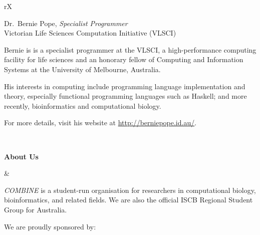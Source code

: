\documentclass[10pt]{article}
\begin{document}
\begin{minipage}[t]{\linewidth}
\begin{tabu}{rX}
\begin{varwidth}[t]{\linewidth}
                               Dr.~Bernie Pope, \emph{Specialist Programmer}\\
                        Victorian Life Sciences Computation Initiative (VLSCI) \par
                    \bigskip
                    \raggedright
                    Bernie is is a specialist programmer at the VLSCI, a
                    high-performance computing facility for life sciences
                    and an honorary fellow of Computing and Information
                    Systems at the University of Melbourne,
                    Australia.\par
                    \medskip
                    His interests in computing include programming language
                    implementation and theory, especially functional
                    programming languages such as Haskell; and more
                    recently, bioinformatics and computational biology.\par
                    \medskip
                    For more details, visit his website at
                    \href{http://berniepope.id.au/}{http://berniepope.id.au/}.
                \end{varwidth}\\
                \midrule
       \begin{varwidth}[t]{\linewidth}
           \textbf{About Us}
       \end{varwidth} &
    \noindent\begin{minipage}[t]{\linewidth}
        \emph{COMBINE} is a student-run organisation for researchers in computational
        biology, bioinformatics, and related fields. We are also the official ISCB Regional Student
        Group for Australia.\par
        \medskip
        We are proudly sponsored by:\par
        \begin{minipage}[t]{\linewidth}
            \centering
        \end{minipage}
    \end{minipage}\\
    \bottomrule
    \end{tabu}
\end{minipage}
\end{document}
